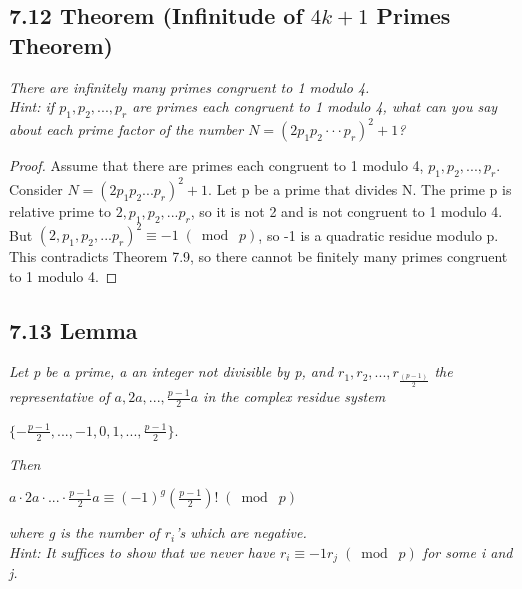 \documentclass{article}
\begin{document}
\subsection*{7.12 Theorem (Infinitude of $4k+1$ Primes Theorem)} 
\quad \textit{There are infinitely many primes congruent to 1 modulo 4.}\\
\textit{Hint: if $p_1, p_2,...,p_r$ are primes each congruent to 1 modulo 4, what can you say about each prime factor of the number $N = (2p_1p_2\cdot\cdot\cdot p_r)^2 + 1$?}

\begin{proof}
Assume that there are primes each congruent to 1 modulo 4, $p_1, p_2,..., p_r$. Consider $N = (2p_1p_2...p_r)^2 + 1$. Let p be a prime that divides N. The prime p is relative prime to $2, p_1, p_2,...p_r$, so it is not 2 and is not congruent to 1 modulo 4. But $(2, p_1, p_2,...p_r)^2 \equiv -1 \;(\bmod\; p)$, so -1 is a quadratic residue modulo p. This contradicts Theorem 7.9, so there cannot be finitely many primes congruent to 1 modulo 4.
\end{proof}

\subsection*{7.13 Lemma} 
\quad \textit{Let p be a prime, a an integer not divisible by p, and $r_1, r_2,...,r_{\frac{(p-1)}{2}}$ the representative of $a,2a,...,\frac{p-1}{2}a$ in the complex residue system}
\begin{center}
    $\{-\frac{p-1}{2},...,-1,0,1,...,\frac{p-1}{2}\}$.
\end{center}
\textit{Then}
\begin{center}
    $a \cdot 2a \cdot ... \cdot \frac{p-1}{2}a \equiv (-1)^g(\frac{p-1}{2})! \;(\bmod\; p)$
\end{center}
\textit{where g is the number of $r_i$'s which are negative.}\\
\textit{Hint: It suffices to show that we never have $r_i \equiv -1r_j \;(\bmod\; p)$ for some i and j.}
\end{document}
